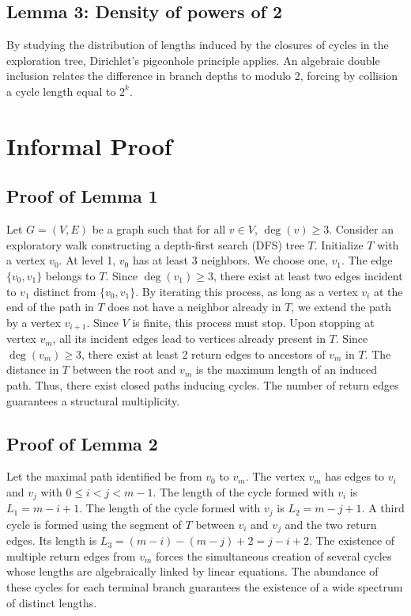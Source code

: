 \documentclass[12pt,a4paper]{article}
\begin{document}
\subsection{Lemma 3: Density of powers of 2}
By studying the distribution of lengths induced by the closures of cycles in the exploration tree, Dirichlet's pigeonhole principle applies. An algebraic double inclusion relates the difference in branch depths to modulo 2, forcing by collision a cycle length equal to $2^k$.

\section{Informal Proof}

\subsection{Proof of Lemma 1}
Let $G = (V,E)$ be a graph such that for all $v \in V$, $\deg(v) \geq 3$.
Consider an exploratory walk constructing a depth-first search (DFS) tree $T$.
Initialize $T$ with a vertex $v_0$.
At level 1, $v_0$ has at least 3 neighbors. We choose one, $v_1$. The edge $\{v_0, v_1\}$ belongs to $T$.
Since $\deg(v_1) \geq 3$, there exist at least two edges incident to $v_1$ distinct from $\{v_0, v_1\}$.
By iterating this process, as long as a vertex $v_i$ at the end of the path in $T$ does not have a neighbor already in $T$, we extend the path by a vertex $v_{i+1}$.
Since $V$ is finite, this process must stop. Upon stopping at vertex $v_m$, all its incident edges lead to vertices already present in $T$.
Since $\deg(v_m) \geq 3$, there exist at least 2 return edges to ancestors of $v_m$ in $T$.
The distance in $T$ between the root and $v_m$ is the maximum length of an induced path. Thus, there exist closed paths inducing cycles. The number of return edges guarantees a structural multiplicity.

\subsection{Proof of Lemma 2}
Let the maximal path identified be from $v_0$ to $v_m$.
The vertex $v_m$ has edges to $v_i$ and $v_j$ with $0 \leq i < j < m-1$.
The length of the cycle formed with $v_i$ is $L_1 = m - i + 1$.
The length of the cycle formed with $v_j$ is $L_2 = m - j + 1$.
A third cycle is formed using the segment of $T$ between $v_i$ and $v_j$ and the two return edges. Its length is $L_3 = (m - i) - (m - j) + 2 = j - i + 2$.
The existence of multiple return edges from $v_m$ forces the simultaneous creation of several cycles whose lengths are algebraically linked by linear equations. The abundance of these cycles for each terminal branch guarantees the existence of a wide spectrum of distinct lengths.
\end{document}
